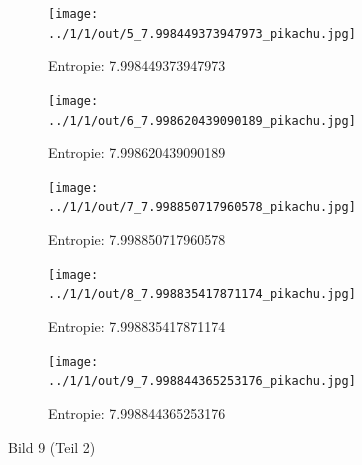 \begin{figure}
	\centering

	\begin{subfigure}{0.25\textwidth}
		\texttt{[image: ../1/1/out/5\_7.998449373947973\_pikachu.jpg]}
		\caption{Entropie: 7.998449373947973}
	\end{subfigure}

	\begin{subfigure}{0.25\textwidth}
		\texttt{[image: ../1/1/out/6\_7.998620439090189\_pikachu.jpg]}
		\caption{Entropie: 7.998620439090189}
	\end{subfigure}

	\begin{subfigure}{0.25\textwidth}
		\texttt{[image: ../1/1/out/7\_7.998850717960578\_pikachu.jpg]}
		\caption{Entropie: 7.998850717960578}
	\end{subfigure}

	\begin{subfigure}{0.25\textwidth}
		\texttt{[image: ../1/1/out/8\_7.998835417871174\_pikachu.jpg]}
		\caption{Entropie: 7.998835417871174}
	\end{subfigure}

	\begin{subfigure}{0.25\textwidth}
		\texttt{[image: ../1/1/out/9\_7.998844365253176\_pikachu.jpg]}
		\caption{Entropie: 7.998844365253176}
	\end{subfigure}

	\caption{Bild 9 (Teil 2)}
\end{figure}

